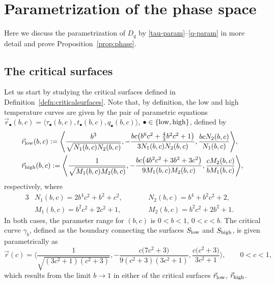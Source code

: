 \documentclass[pdftex]{sigma}
\numberwithin{equation}{section}
\begin{document}
\section{Parametrization of the phase space} \label{app:param}
Here we discuss the parametrization of $D_q$ by \eqref{tau-param}--\eqref{q-param} in more detail and prove Proposition~\ref{prop:phase}.


\subsection{The critical surfaces}
Let us start by studying the critical surfaces defined in Definition~\ref{defn:criticalsurfaces}.
Note that, by definition, the low and high temperature curves are given by the pair of parametric equations $\vec{r}_{\bullet}(b,c) = \langle \tau_{\bullet}(b,c), t_{\bullet}(b,c), q_{\bullet}(b,c)\rangle$, $\bullet \in \{{\rm low}, {\rm high}\}$, defined by
 \begin{align*}
 &\vec{r}_{{\rm low}}(b,c):= \Biggl\langle \frac{b^3}{\sqrt{N_1(b,c)N_2(b,c)}},-\frac{bc\bigl(b^6c^2 + \frac{4}{3}b^2c^2 + 1\bigr)}{3N_1(b,c)N_2(b,c)},\frac{bcN_2(b,c)}{N_1(b,c)}\Biggr\rangle,\\
 &\vec{r}_{{\rm high}}(b,c):= \Biggl\langle \frac{1}{\sqrt{M_1(b,c)M_2(b,c)}},-\frac{bc\bigl(4b^2c^2 + 3b^2 + 3c^2\bigr)}{9M_1(b,c)M_2(b,c)},\frac{cM_2(b,c)}{bM_1(b,c)}\Biggr\rangle,
 \end{align*}
respectively,
where
 \begin{alignat*}{3}
 &N_1(b,c)=2b^4c^2 + b^2 + c^2, \qquad&& N_2(b,c) = b^4 + b^2c^2 + 2,&\\
 &M_1(b,c)=b^2c^2 + 2c^2 + 1, \qquad&& M_2(b,c) =b^2c^2 + 2b^2 + 1.&
 \end{alignat*}
In both cases, the parameter range for $(b,c)$ is $0 < b < 1$, $0< c < b$. The critical curve $\gamma_b$, defined as the boundary connecting the surfaces $S_{{\rm low}}$ and $S_{{\rm high}}$, is given parametrically as
 \begin{equation*}
 \vec{r}(c) = \Biggl\langle\frac{1}{\sqrt{(3c^2+1)(c^2+3)}},-\frac{c\bigl(7c^2 + 3\bigr)}{9(c^2+3)(3c^2+1)},\frac{c\bigl(c^2 + 3\bigr)}{3c^2+1}\Biggr\rangle, \qquad 0 < c < 1,
 \end{equation*}
 which results from the limit $b\to 1$ in either of the critical surfaces $\vec{r}_{{\rm low}}$, $\vec{r}_{{\rm high}}$.
\end{document}
